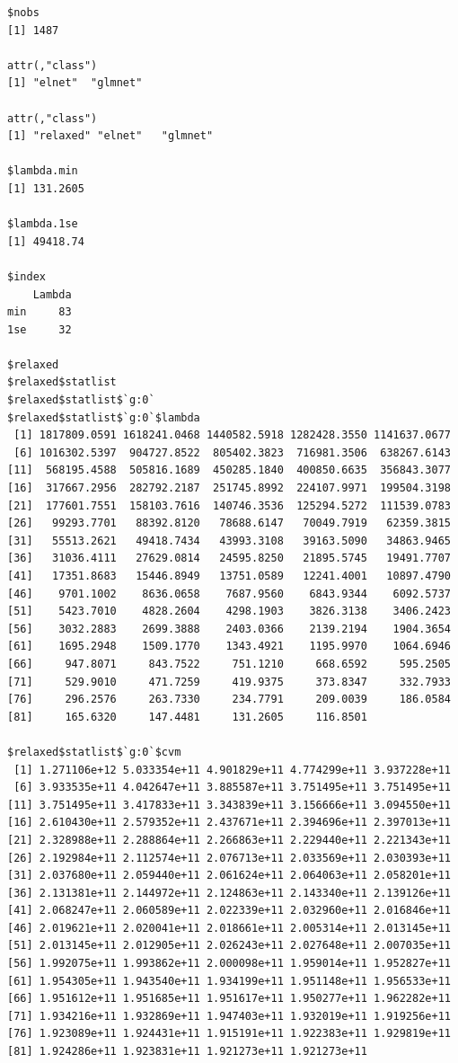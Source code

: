 \documentclass[
]{article}
\begin{document}
\begin{verbatim}
$nobs
[1] 1487

attr(,"class")
[1] "elnet"  "glmnet"

attr(,"class")
[1] "relaxed" "elnet"   "glmnet" 

$lambda.min
[1] 131.2605

$lambda.1se
[1] 49418.74

$index
    Lambda
min     83
1se     32

$relaxed
$relaxed$statlist
$relaxed$statlist$`g:0`
$relaxed$statlist$`g:0`$lambda
 [1] 1817809.0591 1618241.0468 1440582.5918 1282428.3550 1141637.0677
 [6] 1016302.5397  904727.8522  805402.3823  716981.3506  638267.6143
[11]  568195.4588  505816.1689  450285.1840  400850.6635  356843.3077
[16]  317667.2956  282792.2187  251745.8992  224107.9971  199504.3198
[21]  177601.7551  158103.7616  140746.3536  125294.5272  111539.0783
[26]   99293.7701   88392.8120   78688.6147   70049.7919   62359.3815
[31]   55513.2621   49418.7434   43993.3108   39163.5090   34863.9465
[36]   31036.4111   27629.0814   24595.8250   21895.5745   19491.7707
[41]   17351.8683   15446.8949   13751.0589   12241.4001   10897.4790
[46]    9701.1002    8636.0658    7687.9560    6843.9344    6092.5737
[51]    5423.7010    4828.2604    4298.1903    3826.3138    3406.2423
[56]    3032.2883    2699.3888    2403.0366    2139.2194    1904.3654
[61]    1695.2948    1509.1770    1343.4921    1195.9970    1064.6946
[66]     947.8071     843.7522     751.1210     668.6592     595.2505
[71]     529.9010     471.7259     419.9375     373.8347     332.7933
[76]     296.2576     263.7330     234.7791     209.0039     186.0584
[81]     165.6320     147.4481     131.2605     116.8501

$relaxed$statlist$`g:0`$cvm
 [1] 1.271106e+12 5.033354e+11 4.901829e+11 4.774299e+11 3.937228e+11
 [6] 3.933535e+11 4.042647e+11 3.885587e+11 3.751495e+11 3.751495e+11
[11] 3.751495e+11 3.417833e+11 3.343839e+11 3.156666e+11 3.094550e+11
[16] 2.610430e+11 2.579352e+11 2.437671e+11 2.394696e+11 2.397013e+11
[21] 2.328988e+11 2.288864e+11 2.266863e+11 2.229440e+11 2.221343e+11
[26] 2.192984e+11 2.112574e+11 2.076713e+11 2.033569e+11 2.030393e+11
[31] 2.037680e+11 2.059440e+11 2.061624e+11 2.064063e+11 2.058201e+11
[36] 2.131381e+11 2.144972e+11 2.124863e+11 2.143340e+11 2.139126e+11
[41] 2.068247e+11 2.060589e+11 2.022339e+11 2.032960e+11 2.016846e+11
[46] 2.019621e+11 2.020041e+11 2.018661e+11 2.005314e+11 2.013145e+11
[51] 2.013145e+11 2.012905e+11 2.026243e+11 2.027648e+11 2.007035e+11
[56] 1.992075e+11 1.993862e+11 2.000098e+11 1.959014e+11 1.952827e+11
[61] 1.954305e+11 1.943540e+11 1.934199e+11 1.951148e+11 1.956533e+11
[66] 1.951612e+11 1.951685e+11 1.951617e+11 1.950277e+11 1.962282e+11
[71] 1.934216e+11 1.932869e+11 1.947403e+11 1.932019e+11 1.919256e+11
[76] 1.923089e+11 1.924431e+11 1.915191e+11 1.922383e+11 1.929819e+11
[81] 1.924286e+11 1.923831e+11 1.921273e+11 1.921273e+11


\end{verbatim}
\end{document}
